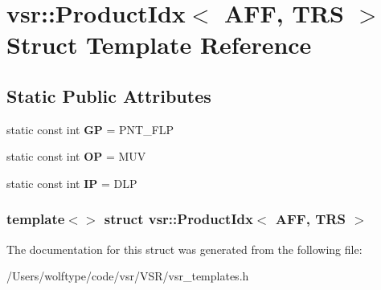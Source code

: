 \hypertarget{structvsr_1_1_product_idx_3_01_a_f_f_00_01_t_r_s_01_4}{\section{vsr\-:\-:Product\-Idx$<$ A\-F\-F, T\-R\-S $>$ Struct Template Reference}
\label{structvsr_1_1_product_idx_3_01_a_f_f_00_01_t_r_s_01_4}
}
\subsection*{Static Public Attributes}
\begin{DoxyCompactItemize}
\item 
\hypertarget{structvsr_1_1_product_idx_3_01_a_f_f_00_01_t_r_s_01_4_a50c8cbc33b15112d604cfc58807720f3}{static const int {\bfseries G\-P} = P\-N\-T\-\_\-\-F\-L\-P}\label{structvsr_1_1_product_idx_3_01_a_f_f_00_01_t_r_s_01_4_a50c8cbc33b15112d604cfc58807720f3}

\item 
\hypertarget{structvsr_1_1_product_idx_3_01_a_f_f_00_01_t_r_s_01_4_a214276c84ba17d18ab161f8c7abc346c}{static const int {\bfseries O\-P} = M\-U\-V}\label{structvsr_1_1_product_idx_3_01_a_f_f_00_01_t_r_s_01_4_a214276c84ba17d18ab161f8c7abc346c}

\item 
\hypertarget{structvsr_1_1_product_idx_3_01_a_f_f_00_01_t_r_s_01_4_a342a95b89bd678265d786e614bbd95e5}{static const int {\bfseries I\-P} = D\-L\-P}\label{structvsr_1_1_product_idx_3_01_a_f_f_00_01_t_r_s_01_4_a342a95b89bd678265d786e614bbd95e5}

\end{DoxyCompactItemize}
\subsubsection*{template$<$$>$ struct vsr\-::\-Product\-Idx$<$ A\-F\-F, T\-R\-S $>$}



The documentation for this struct was generated from the following file\-:\begin{DoxyCompactItemize}
\item 
/\-Users/wolftype/code/vsr/\-V\-S\-R/vsr\-\_\-templates.\-h\end{DoxyCompactItemize}
